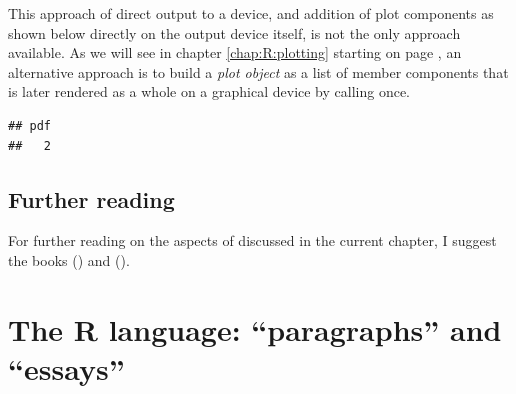 \documentclass[krantz2]{krantz}\usepackage{knitr}
\begin{document}
\begin{warningbox}
This approach of direct output to a device, and addition of plot components as shown below directly on the output device itself, is not the only approach available. As we will see in chapter \ref{chap:R:plotting} starting on page \pageref{chap:R:plotting}, an alternative approach is to build a \emph{plot object} as a list of member components that is later rendered as a whole on a graphical device by calling  once.

\begin{knitrout}\footnotesize
{}\color{fgcolor}\begin{kframe}
\begin{alltt}
\hlstd{(} \hlstd{=} \hlstd{,}  \hlstd{=} \hlstd{,}  \hlstd{=} \hlstd{)}
 \hlopt{~}   
\hlstd{(} \hlstd{=} \hlstd{,}  \hlstd{=} \hlstd{,}  \hlstd{=} \hlstd{)}
\hlstd{()}
\end{alltt}
\begin{verbatim}
## pdf 
##   2
\end{verbatim}
\end{kframe}
\end{knitrout}
\end{warningbox}

\section{Further reading}
For further reading on the aspects of \Rlang discussed in the current chapter,
 I suggest the books  (\citeauthor{Peng2016}) and  (\citeauthor{Matloff2011}).











\chapter{The R language: ``paragraphs'' and ``essays''}\label{chap:R:scripts}
\end{document}
